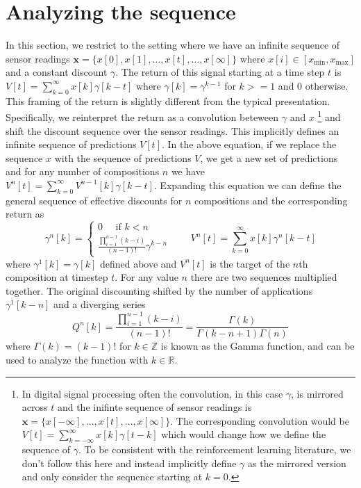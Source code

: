 \documentclass[11pt]{article} %
\begin{document}
\section{Analyzing the sequence}\label{sec:analyze}

In this section, we restrict to the setting where we have an infinite sequence of
sensor readings $\mathbf{x} = \{x[0], x[1], \ldots,
x[t], \ldots, x[\infty]\}$ where $x[i] \in
[x_{\text{min}} , x_{\text{max}}]$ and a constant discount $\gamma$.
The return of this signal starting at a time step $t$ is
%
$V[t] = \sum_{k=0}^\infty x[k] \gamma[k-t]$
%
%
where $\gamma[k] = \gamma^{k-1}$ for $k >= 1$ and $0$ otherwise. This
framing of the return is slightly different from the typical
presentation. Specifically, we reinterpret the return as a convolution
beteween $\gamma$ and $x$ \footnote{In digital signal processing
  \parencite{oppenheim2010discrete} often the
  convolution, in this
  case $\gamma$, is mirrored across $t$ and the inifinte sequence of
  sensor readings is $\mathbf{x} = \{x[-\infty], \ldots,
x[t], \ldots, x[\infty]\}$. The corresponding convolution
  would be $V[t] = \sum_{k=-\infty}^\infty x[k] \gamma[t-k]$ which
  would change how we define the sequence of $\gamma$. To be
  consistent with the reinforcement learning literature, we don't
  follow this here and instead implicitly define $\gamma$ as the
  mirrored version and only consider the sequence starting at $k=0$.}
and shift the discount sequence over the sensor readings.
This implicitly defines an infinite sequence
of predictions $V[t]$. In the above equation, if we replace the
sequence $x$ with the sequence of predictions $V$, we get a new set of
predictions and for any number of compositions $n$ we have
%
$V^n[t] = \sum_{k=0}^\infty V^{n-1}[k] \gamma[k-t]$.
%
Expanding this equation we can
define the general sequence of effective discounts for $n$
compositions and the corresponding return as
%
%
\[
  \gamma^n[k] = \begin{cases}
    0 \quad \mbox{ if } k < n \\
    \frac{\prod_{i=1}^{n-1} (k-i)}{(n-1)!} \gamma^{k - n}
  \end{cases} \quad\quad V^n[t] = \sum_{k=0}^\infty x[k] \gamma^n[k - t]
\]
%
where $\gamma^1[k] = \gamma[k]$ defined above and $V^n[t]$ is the
target of the $n$th composition at timestep $t$. For any value $n$ there
are two sequences multiplied together. The original discounting
shifted by the number of applications $\gamma^1[k-n]$ and a diverging
series
%
\[
  Q^n[k] = \frac{\prod_{i=1}^{n-1} (k-i)}{(n-1)!} = \frac{\Gamma(k)}{\Gamma(k-n+1)\Gamma(n)}
\]
%
where $\Gamma(k) = (k-1)!$ for $k \in \mathbb{Z}$ is known as the
Gamma function, and can be used to analyze the function with $k \in \mathbb{R}$.
\end{document}
